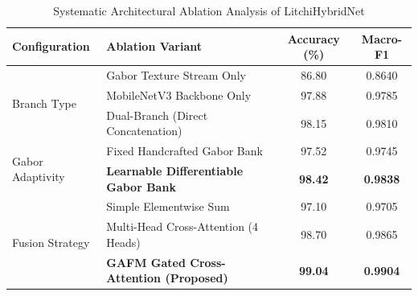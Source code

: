 \begin{table}[t]
\centering
\caption{Systematic Architectural Ablation Analysis of LitchiHybridNet}
\label{tab:ablation}
\begin{tabular}{llcc}
\toprule
\textbf{Configuration} & \textbf{Ablation Variant} & \textbf{Accuracy (\%)} & \textbf{Macro-F1} \\
\midrule
\multirow{3}{*}{Branch Type} & Gabor Texture Stream Only & 86.80 & 0.8640 \\
 & MobileNetV3 Backbone Only & 97.88 & 0.9785 \\
 & Dual-Branch (Direct Concatenation) & 98.15 & 0.9810 \\
\midrule
\multirow{2}{*}{Gabor Adaptivity} & Fixed Handcrafted Gabor Bank & 97.52 & 0.9745 \\
 & \textbf{Learnable Differentiable Gabor Bank} & \textbf{98.42} & \textbf{0.9838} \\
\midrule
\multirow{3}{*}{Fusion Strategy} & Simple Elementwise Sum & 97.10 & 0.9705 \\
 & Multi-Head Cross-Attention (4 Heads) & 98.70 & 0.9865 \\
 & \textbf{GAFM Gated Cross-Attention (Proposed)} & \textbf{99.04} & \textbf{0.9904} \\
\bottomrule
\end{tabular}
\end{table}
